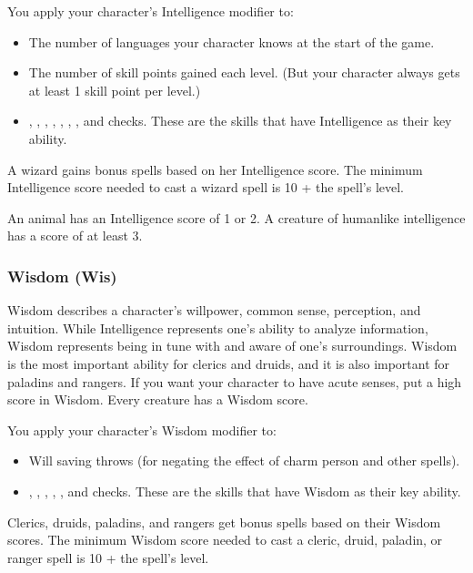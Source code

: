You apply your character's Intelligence modifier to:
\begin{itemize}
\item The number of languages your character knows at the start of the game.
\item The number of skill points gained each level. (But your character always gets at 
least 1 skill point per level.)
\item {}, , , , , , , and 
 checks. These are the skills that have Intelligence as their key ability.
\end{itemize}
A wizard gains bonus spells based on her Intelligence score. The minimum Intelligence 
score needed to cast a wizard spell is 10 + the spell's level. 

An animal has an Intelligence score of 1 or 2. A creature of humanlike intelligence 
has a score of at least 3.

\subsubsection{Wisdom (Wis)}

Wisdom describes a character's willpower, common sense, perception, and intuition. 
While Intelligence represents one's ability to analyze information, Wisdom represents 
being in tune with and aware of one's surroundings. Wisdom is the most important 
ability for clerics and druids, and it is also important for paladins and rangers. 
If you want your character to have acute senses, put a high score in Wisdom. Every 
creature has a Wisdom score.

You apply your character's Wisdom modifier to:
\begin{itemize}
\item Will saving throws (for negating the effect of charm person and other spells).
\item {}, , , , , and  checks. These are the 
skills that have Wisdom as their key ability.
\end{itemize}
Clerics, druids, paladins, and rangers get bonus spells based on their Wisdom scores. 
The minimum Wisdom score needed to cast a cleric, druid, paladin, or ranger spell 
is 10 + the spell's level.


